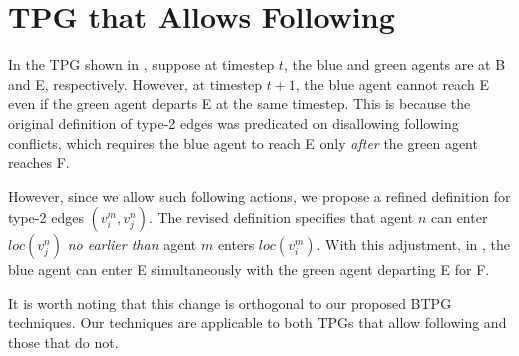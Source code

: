 \documentclass[letterpaper]{article} %
\theoremstyle{definition}
\newcommand{\rishi}[1]{\textcolor{black}{\textbf{Rishi:}} 
\textcolor{purple}{#1}}
\newcommand{\andrew}[1]{\textcolor{black}{\textbf{Yifan:}} \textcolor{blue}{#1}}
\begin{document}



\section{TPG that Allows Following}
In the TPG shown in , suppose at timestep $t$, the blue and green agents are at B and E, respectively. However, at timestep $t+1$, the blue agent cannot reach E even if the green agent departs E at the same timestep. This is because the original definition of type-2 edges was predicated on disallowing following conflicts, which requires the blue agent to reach E only \emph{after} the green agent reaches F.

However, since we allow such following actions, we propose a refined definition for type-2 edges $(v_i^m, v_j^n)$. The revised definition specifies that agent $n$ can enter $loc(v_{j}^n)$ \emph{no earlier than} agent $m$ enters $loc(v_{i}^m)$.
With this adjustment, in , the blue agent can enter E simultaneously with the green agent departing E for F.

It is worth noting that this change is orthogonal to our proposed BTPG techniques. Our techniques are applicable to both TPGs that allow following and those that do not.
\end{document}
